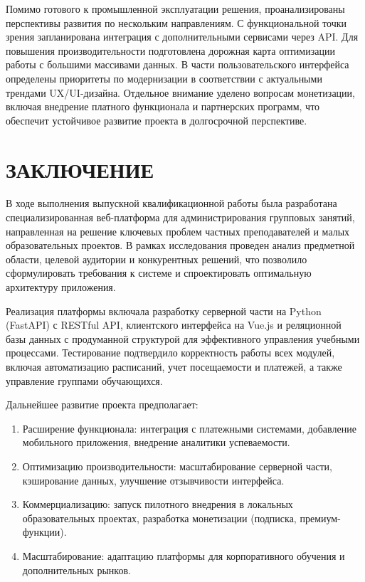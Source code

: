 \documentclass[a4paper,14pt,oneside]{extreport}
\begin{document}
Помимо готового к промышленной эксплуатации решения, проанализированы перспективы развития по нескольким направлениям. С функциональной точки зрения запланирована интеграция с дополнительными сервисами через API. Для повышения производительности подготовлена дорожная карта оптимизации работы с большими массивами данных. В части пользовательского интерфейса определены приоритеты по модернизации в соответствии с актуальными трендами UX/UI-дизайна. Отдельное внимание уделено вопросам монетизации, включая внедрение платного функционала и партнерских программ, что обеспечит устойчивое развитие проекта в долгосрочной перспективе.

\chapter*{ЗАКЛЮЧЕНИЕ}

В ходе выполнения выпускной квалификационной работы была разработана специализированная веб-платформа для администрирования групповых занятий, направленная на решение ключевых проблем частных преподавателей и малых образовательных проектов. В рамках исследования проведен анализ предметной области, целевой аудитории и конкурентных решений, что позволило сформулировать требования к системе и спроектировать оптимальную архитектуру приложения.

Реализация платформы включала разработку серверной части на Python (FastAPI) с RESTful API, клиентского интерфейса на Vue.js и реляционной базы данных с продуманной структурой для эффективного управления учебными процессами. Тестирование подтвердило корректность работы всех модулей, включая автоматизацию расписаний, учет посещаемости и платежей, а также управление группами обучающихся.

Дальнейшее развитие проекта предполагает:

\begin{enumerate}
    \item Расширение функционала: интеграция с платежными системами, добавление мобильного приложения, внедрение аналитики успеваемости.
    \item Оптимизацию производительности: масштабирование серверной части, кэширование данных, улучшение отзывчивости интерфейса.
    \item Коммерциализацию: запуск пилотного внедрения в локальных образовательных проектах, разработка монетизации (подписка, премиум-функции).
    \item Масштабирование: адаптацию платформы для корпоративного обучения и дополнительных рынков.
\end{enumerate}
\end{document}
